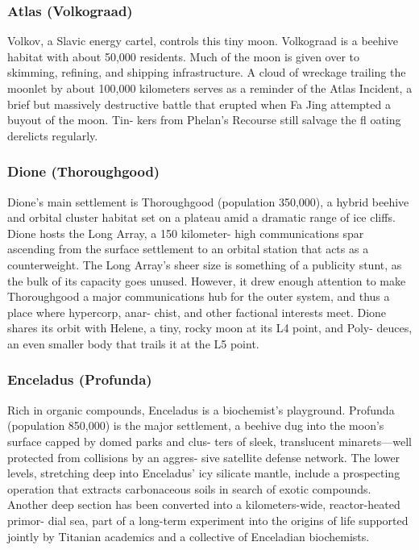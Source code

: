 \subsubsection{Atlas (Volkograad)}

Volkov, a Slavic energy cartel, controls this 
tiny moon. Volkograad is a beehive habitat 
with about 50,000 residents. Much of the 
moon is given over to skimming, refining, 
and shipping infrastructure. A cloud of 
wreckage trailing the moonlet by about 
100,000 kilometers serves as a reminder 
of the Atlas Incident, a brief but massively 
destructive battle that erupted when Fa 
Jing attempted a buyout of the moon. Tin-
kers from Phelan's Recourse still salvage 
the fl oating derelicts regularly.

\subsubsection{Dione (Thoroughgood)}

Dione's main settlement is Thoroughgood 
(population 350,000), a hybrid beehive 
and orbital cluster habitat set on a plateau 
amid a dramatic range of ice cliffs. Dione 
hosts the Long Array, a 150 kilometer-
high communications spar ascending 
from the surface settlement to an orbital 
station that acts as a counterweight. The 
Long Array's sheer size is something of a 
publicity stunt, as the bulk of its capacity 
goes unused. However, it drew enough 
attention to make Thoroughgood a major 
communications hub for the outer system, 
and thus a place where hypercorp, anar-
chist, and other factional interests meet. 
Dione shares its orbit with Helene, a tiny, 
rocky moon at its L4 point, and Poly-
deuces, an even smaller body that trails it 
at the L5 point.

\subsubsection{Enceladus (Profunda)}

Rich in organic compounds, Enceladus 
is a biochemist's playground. Profunda 
(population 850,000) is the major 
settlement, a beehive dug into the moon's 
surface capped by domed parks and clus-
ters of sleek, translucent minarets—well 
protected from collisions by an aggres-
sive satellite defense network. The lower 
levels, stretching deep into Enceladus' 
icy silicate mantle, include a prospecting 
operation that extracts carbonaceous soils 
in search of exotic compounds. Another 
deep section has been converted into a 
kilometers-wide, reactor-heated primor-
dial sea, part of a long-term experiment 
into the origins of life supported jointly 
by Titanian academics and a collective of 
Enceladian biochemists.

